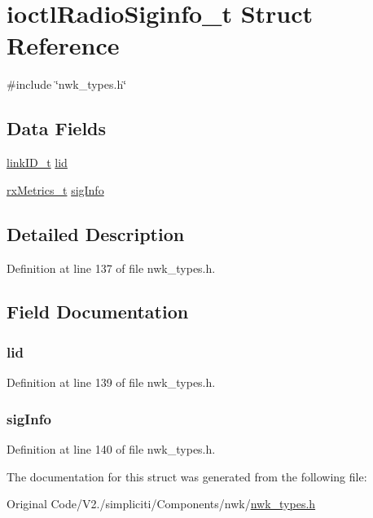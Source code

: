 \hypertarget{structioctlRadioSiginfo__t}{\section{ioctl\-Radio\-Siginfo\-\_\-t \-Struct \-Reference}
\label{structioctlRadioSiginfo__t}
}


{\ttfamily \#include \char`\"{}nwk\-\_\-types.\-h\char`\"{}}

\subsection*{\-Data \-Fields}
\begin{DoxyCompactItemize}
\item 
\hyperlink{nwk__types_8h_a542d45d12faba7ae8fd0c989ef2c8528}{link\-I\-D\-\_\-t} \hyperlink{structioctlRadioSiginfo__t_ac37c121af45cbf458e3af68c470b5531}{lid}
\item 
\hyperlink{structrxMetrics__t}{rx\-Metrics\-\_\-t} \hyperlink{structioctlRadioSiginfo__t_a87903a190e749b4aa6e73a2aa5d18ff1}{sig\-Info}
\end{DoxyCompactItemize}


\subsection{\-Detailed \-Description}


\-Definition at line 137 of file nwk\-\_\-types.\-h.



\subsection{\-Field \-Documentation}
\hypertarget{structioctlRadioSiginfo__t_ac37c121af45cbf458e3af68c470b5531}{
\subsubsection[{lid}]{ {\bf lid}}}\label{structioctlRadioSiginfo__t_ac37c121af45cbf458e3af68c470b5531}


\-Definition at line 139 of file nwk\-\_\-types.\-h.

\hypertarget{structioctlRadioSiginfo__t_a87903a190e749b4aa6e73a2aa5d18ff1}{
\subsubsection[{sig\-Info}]{ {\bf sig\-Info}}}\label{structioctlRadioSiginfo__t_a87903a190e749b4aa6e73a2aa5d18ff1}


\-Definition at line 140 of file nwk\-\_\-types.\-h.



\-The documentation for this struct was generated from the following file\-:\begin{DoxyCompactItemize}
\item 
\-Original Code/\-V2./simpliciti/\-Components/nwk/\hyperlink{nwk__types_8h}{nwk\-\_\-types.\-h}\end{DoxyCompactItemize}
